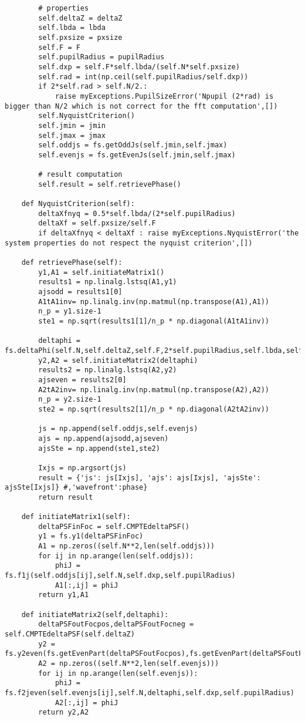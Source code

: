 \begin{lstlisting}
        # properties   
        self.deltaZ = deltaZ
        self.lbda = lbda
        self.pxsize = pxsize
        self.F = F
        self.pupilRadius = pupilRadius
        self.dxp = self.F*self.lbda/(self.N*self.pxsize)
        self.rad = int(np.ceil(self.pupilRadius/self.dxp))
        if 2*self.rad > self.N/2.:
            raise myExceptions.PupilSizeError('Npupil (2*rad) is bigger than N/2 which is not correct for the fft computation',[])
        self.NyquistCriterion()
        self.jmin = jmin
        self.jmax = jmax
        self.oddjs = fs.getOddJs(self.jmin,self.jmax)
        self.evenjs = fs.getEvenJs(self.jmin,self.jmax)
        
        # result computation
        self.result = self.retrievePhase()

    def NyquistCriterion(self):
        deltaXfnyq = 0.5*self.lbda/(2*self.pupilRadius)
        deltaXf = self.pxsize/self.F
        if deltaXfnyq < deltaXf : raise myExceptions.NyquistError('the system properties do not respect the nyquist criterion',[])

    def retrievePhase(self):
        y1,A1 = self.initiateMatrix1()
        results1 = np.linalg.lstsq(A1,y1)
        ajsodd = results1[0]
        A1tA1inv= np.linalg.inv(np.matmul(np.transpose(A1),A1))
        n_p = y1.size-1
        ste1 = np.sqrt(results1[1]/n_p * np.diagonal(A1tA1inv))
        
        deltaphi = fs.deltaPhi(self.N,self.deltaZ,self.F,2*self.pupilRadius,self.lbda,self.dxp)
        y2,A2 = self.initiateMatrix2(deltaphi)
        results2 = np.linalg.lstsq(A2,y2)
        ajseven = results2[0]
        A2tA2inv= np.linalg.inv(np.matmul(np.transpose(A2),A2))
        n_p = y2.size-1
        ste2 = np.sqrt(results2[1]/n_p * np.diagonal(A2tA2inv))

        js = np.append(self.oddjs,self.evenjs)
        ajs = np.append(ajsodd,ajseven)
        ajsSte = np.append(ste1,ste2)

        Ixjs = np.argsort(js)
        result = {'js': js[Ixjs], 'ajs': ajs[Ixjs], 'ajsSte': ajsSte[Ixjs]} #,'wavefront':phase}
        return result

    def initiateMatrix1(self):
        deltaPSFinFoc = self.CMPTEdeltaPSF()
        y1 = fs.y1(deltaPSFinFoc)
        A1 = np.zeros((self.N**2,len(self.oddjs)))
        for ij in np.arange(len(self.oddjs)):
            phiJ = fs.f1j(self.oddjs[ij],self.N,self.dxp,self.pupilRadius)
            A1[:,ij] = phiJ
        return y1,A1
    
    def initiateMatrix2(self,deltaphi):
        deltaPSFoutFocpos,deltaPSFoutFocneg = self.CMPTEdeltaPSF(self.deltaZ)
        y2 = fs.y2even(fs.getEvenPart(deltaPSFoutFocpos),fs.getEvenPart(deltaPSFoutFocneg))
        A2 = np.zeros((self.N**2,len(self.evenjs)))
        for ij in np.arange(len(self.evenjs)):
            phiJ = fs.f2jeven(self.evenjs[ij],self.N,deltaphi,self.dxp,self.pupilRadius)
            A2[:,ij] = phiJ
        return y2,A2


\end{lstlisting}
